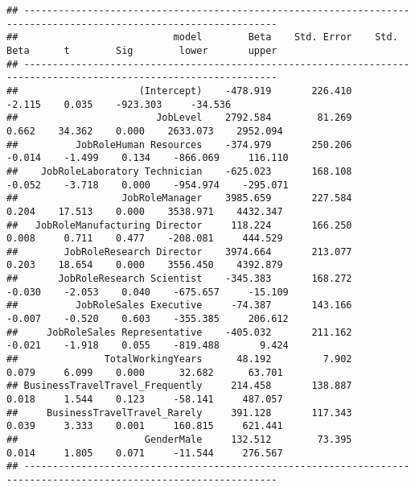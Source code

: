 \documentclass[]{article}
\begin{document}
\begin{verbatim}
## ------------------------------------------------------------------------------------------------------------------
##                           model        Beta    Std. Error    Std. Beta      t        Sig        lower       upper 
## ------------------------------------------------------------------------------------------------------------------
##                     (Intercept)    -478.919       226.410                 -2.115    0.035    -923.303     -34.536 
##                        JobLevel    2792.584        81.269        0.662    34.362    0.000    2633.073    2952.094 
##          JobRoleHuman Resources    -374.979       250.206       -0.014    -1.499    0.134    -866.069     116.110 
##    JobRoleLaboratory Technician    -625.023       168.108       -0.052    -3.718    0.000    -954.974    -295.071 
##                  JobRoleManager    3985.659       227.584        0.204    17.513    0.000    3538.971    4432.347 
##   JobRoleManufacturing Director     118.224       166.250        0.008     0.711    0.477    -208.081     444.529 
##        JobRoleResearch Director    3974.664       213.077        0.203    18.654    0.000    3556.450    4392.879 
##       JobRoleResearch Scientist    -345.383       168.272       -0.030    -2.053    0.040    -675.657     -15.109 
##          JobRoleSales Executive     -74.387       143.166       -0.007    -0.520    0.603    -355.385     206.612 
##     JobRoleSales Representative    -405.032       211.162       -0.021    -1.918    0.055    -819.488       9.424 
##               TotalWorkingYears      48.192         7.902        0.079     6.099    0.000      32.682      63.701 
## BusinessTravelTravel_Frequently     214.458       138.887        0.018     1.544    0.123     -58.141     487.057 
##     BusinessTravelTravel_Rarely     391.128       117.343        0.039     3.333    0.001     160.815     621.441 
##                      GenderMale     132.512        73.395        0.014     1.805    0.071     -11.544     276.567 
## ------------------------------------------------------------------------------------------------------------------
\end{verbatim}
\end{document}
